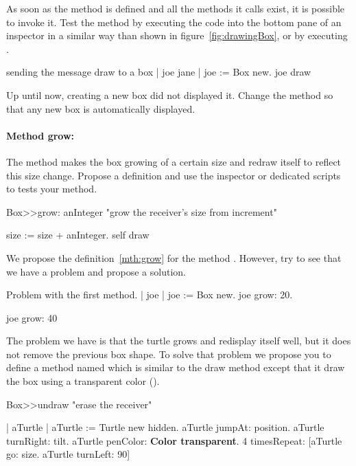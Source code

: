 As soon as the method is defined and all the methods it calls exist, it is possible to invoke it.
Test the method by executing the code  into the bottom pane of an inspector in a similar way than shown in figure~\ref{fig:drawingBox}, or by executing .

\begin{scriptwithtitle}{sending the message draw to a box}\label{scr:draw}
| joe jane |
joe := Box new.
joe draw
\end{scriptwithtitle}




\begin{exercise}
Up until now, creating a new box did not displayed it.  Change the
method  so that any new box is automatically displayed.
\end{exercise}


\paragraph{Method grow:} The method  makes the box
growing of a certain size and redraw itself to reflect this size
change.  Propose a definition and  use the inspector or dedicated scripts to tests your method. 

\begin{method}\label{mth:grow}
Box>>grow: anInteger 
   "grow the receiver's size from increment"
   
    size := size + anInteger.
    self draw
\end{method}


We propose the definition~\ref{mth:grow} for the method .
However, try  to see that we have a problem and 
propose a solution.


\begin{scriptwithtitle}{Problem with the first  
method.}\label{scr:growProblem}
| joe |
joe := Box new.
joe grow: 20.

joe grow: 40
\end{scriptwithtitle}

The problem we have is that the turtle grows and redisplay itself 
well, but it does not remove the previous box shape. To solve that 
problem we propose you to define a method named  which 
is similar to the draw method except that it draw the box using a 
transparent color ().

\begin{method}\label{mt:undraw}
Box>>undraw
   "erase the receiver"
   
   | aTurtle |
   aTurtle := Turtle new hidden.
   aTurtle jumpAt: position.
   aTurtle turnRight: tilt.
   aTurtle penColor: \textbf{Color transparent}.
   4 timesRepeat: [aTurtle go: size.
                  aTurtle turnLeft: 90]
\end{method}

